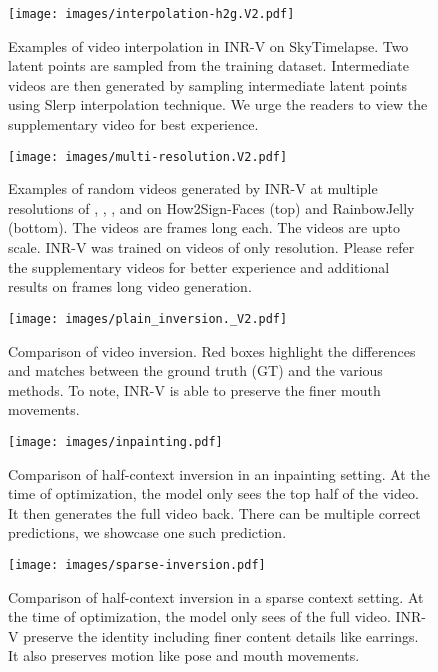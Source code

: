 \documentclass[10pt]{article} \usepackage[accepted]{tmlr}
\begin{document}
\begin{figure}[t]
  \centering
  \texttt{[image: images/interpolation-h2g.V2.pdf]}
  \caption{Examples of video interpolation in INR-V on SkyTimelapse. Two latent points are sampled from the training dataset. Intermediate videos are then generated by sampling intermediate latent points using Slerp interpolation technique. We urge the readers to view the supplementary video for best experience. }
  \label{fig:interpolation-sky-appendix}
\end{figure}

\begin{figure}[t]
  \centering
  \texttt{[image: images/multi-resolution.V2.pdf]}
  \caption{Examples of random videos generated by INR-V at multiple resolutions of , , , and  on How2Sign-Faces (top) and RainbowJelly (bottom). The videos are  frames long each. The videos are upto scale. INR-V was trained on videos of only  resolution. Please refer the supplementary videos for better experience and additional results on  frames long video generation. }
  \label{fig:multi-resolution-appendix}
\end{figure}

\begin{figure}[t]
  \centering
  \texttt{[image: images/plain\_inversion.\_V2.pdf]}
  \caption{Comparison of video inversion. Red boxes highlight the differences and matches between the ground truth (GT) and the various methods. To note, INR-V is able to preserve the finer mouth movements.}
  \label{fig:plain-inversion-appendix}
\end{figure}

\begin{figure}[t]
  \centering
  \texttt{[image: images/inpainting.pdf]}
  \caption{Comparison of half-context inversion in an inpainting setting. At the time of optimization, the model only sees the top half of the video. It then generates the full video back. There can be multiple correct predictions, we showcase one such prediction.}
  \label{fig:inpainting-appendix}
\end{figure}

\begin{figure}[t]
  \centering
  \texttt{[image: images/sparse-inversion.pdf]}
  \caption{Comparison of half-context inversion in a sparse context setting. At the time of optimization, the model only sees  of the full video. INR-V preserve the identity including finer content details like earrings. It also preserves motion like pose and mouth movements.}
  \label{fig:sparse-inpainting-appendix}
\end{figure}
\end{document}
